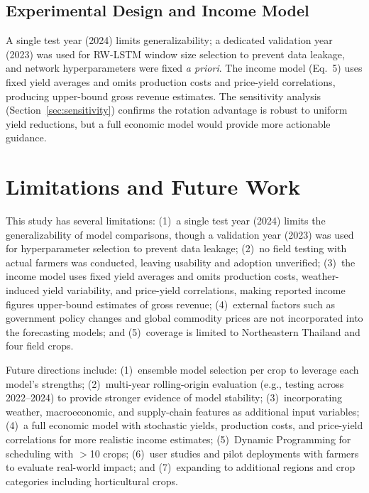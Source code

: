 \documentclass[conference]{IEEEtran}
\begin{document}
\subsection{Experimental Design and Income Model}

A single test year (2024) limits generalizability; a dedicated validation year (2023) was used for RW-LSTM window size selection to prevent data leakage, and network hyperparameters were fixed \textit{a priori}. The income model (Eq.~5) uses fixed yield averages and omits production costs and price-yield correlations, producing upper-bound gross revenue estimates. The sensitivity analysis (Section~\ref{sec:sensitivity}) confirms the rotation advantage is robust to uniform yield reductions, but a full economic model would provide more actionable guidance.

\section{Limitations and Future Work}

This study has several limitations: (1)~a single test year (2024) limits the generalizability of model comparisons, though a validation year (2023) was used for hyperparameter selection to prevent data leakage; (2)~no field testing with actual farmers was conducted, leaving usability and adoption unverified; (3)~the income model uses fixed yield averages and omits production costs, weather-induced yield variability, and price-yield correlations, making reported income figures upper-bound estimates of gross revenue; (4)~external factors such as government policy changes and global commodity prices are not incorporated into the forecasting models; and (5)~coverage is limited to Northeastern Thailand and four field crops.

Future directions include: (1)~ensemble model selection per crop to leverage each model's strengths; (2)~multi-year rolling-origin evaluation (e.g., testing across 2022--2024) to provide stronger evidence of model stability; (3)~incorporating weather, macroeconomic, and supply-chain features as additional input variables; (4)~a full economic model with stochastic yields, production costs, and price-yield correlations for more realistic income estimates; (5)~Dynamic Programming for scheduling with $>$10 crops; (6)~user studies and pilot deployments with farmers to evaluate real-world impact; and (7)~expanding to additional regions and crop categories including horticultural crops.
\end{document}
